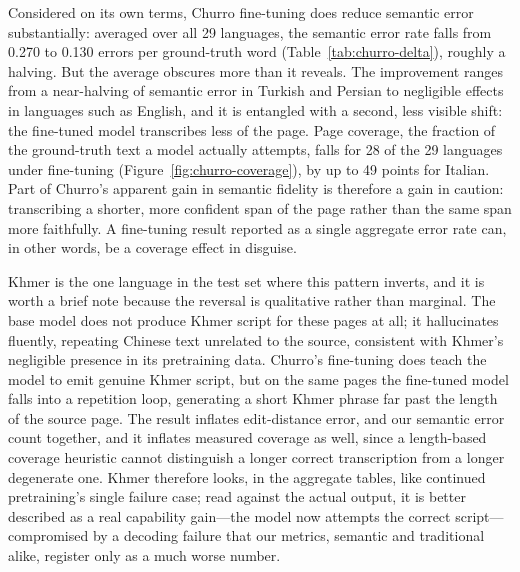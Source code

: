 \documentclass{anthology-ch}         %
\begin{document}
Considered on its own terms, Churro fine-tuning does reduce semantic
error substantially: averaged over all 29 languages, the semantic error rate
falls from 0.270 to 0.130 errors per ground-truth word
(Table~\ref{tab:churro-delta}), roughly a halving. But the average obscures
more than it reveals. The improvement ranges from a near-halving of semantic
error in Turkish and Persian to negligible effects in languages such as
English, and it is entangled with a second, less visible shift: the
fine-tuned model transcribes less of the page. Page coverage, the fraction
of the ground-truth text a model actually attempts, falls for 28 of the 29
languages under fine-tuning (Figure~\ref{fig:churro-coverage}), by up to 
49 points for Italian. Part of Churro's apparent gain in semantic fidelity is
therefore a gain in caution: transcribing a shorter, more confident span of
the page rather than the same span more faithfully. A fine-tuning result
reported as a single aggregate error rate can, in other words, be a coverage
effect in disguise.

Khmer is the one language in the test set where this pattern inverts, and it
is worth a brief note because the reversal is qualitative rather than
marginal. The base model does not produce Khmer script for these pages at
all; it hallucinates fluently, repeating Chinese text unrelated to the source,
consistent with Khmer's negligible presence in its pretraining data.
Churro's fine-tuning does teach the model to emit genuine Khmer script, but
on the same pages the fine-tuned model falls into a repetition loop,
generating a short Khmer phrase far past the length of the source page. The
result inflates edit-distance error, and our semantic error count together,
and it inflates measured coverage as well, since a length-based coverage
heuristic cannot distinguish a longer correct transcription from a longer
degenerate one. Khmer therefore looks, in the aggregate tables, like
continued pretraining's single failure case; read against the actual output, it is
better described as a real capability gain---the model now attempts the
correct script---compromised by a decoding failure that our metrics,
semantic and traditional alike, register only as a much worse number.
\end{document}
